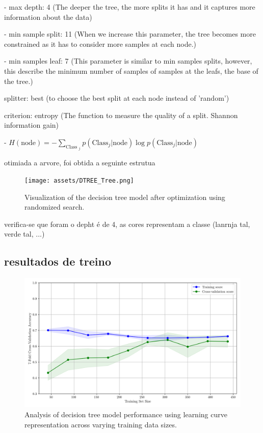 \documentclass[conference]{IEEEtran}
\begin{document}
- max depth: 4 (The deeper the tree, the more splits it has and it captures more information about the data)

- min sample split: 11 (When we increase this parameter, the tree becomes more constrained as it has to consider more samples at each node.)

- min samples leaf: 7 (This parameter is similar to min samples splits, however, this describe the minimum number of samples of samples at the leafs, the base of the tree.)

splitter: best (to choose the best split at each node instead of 'random')

criterion: entropy (The function to measure the quality of a split. Shannon information gain)

    - $H(\text{node}) = - \sum_{\text{Class }_j} p(\text{Class}_j | \text{node}) \log p(\text{Class}_j | \text{node})$



otimiada a arvore, foi obtida a seguinte estrutua

\begin{figure}[H]
    \centering
    \texttt{[image: assets/DTREE\_Tree.png]}
    \caption{Visualization of the decision tree model after optimization using randomized search.}
    \label{dtree_tree}
\end{figure}

verifica-se que foram o depht é de 4, as cores representam a classe (lanrnja tal, verde tal, ...)

\subsection{resultados de treino}

\begin{figure}[H]
    \centering
    \includegraphics[width=1\linewidth]{assets/DTREE_LearningCurve.png}
    \caption{Analysis of decision tree model performance using learning curve representation across varying training data sizes.}
    \label{dtree_lcurve}
\end{figure}
\end{document}
